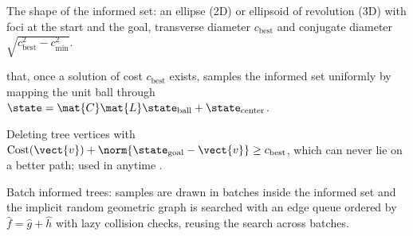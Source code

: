 \item[Prolate hyperspheroid] The shape of the informed set: an ellipse (2D) or ellipsoid of revolution (3D) with foci at the start and the goal, transverse diameter $c_{\mathrm{best}}$ and conjugate diameter $\sqrt{c_{\mathrm{best}}^2-c_{\min}^2}$.
\item[Informed RRT*] \rrtstar that, once a solution of cost $c_{\mathrm{best}}$ exists, samples the informed set uniformly by mapping the unit ball through $\state=\mat{C}\mat{L}\state_{\mathrm{ball}}+\state_{\mathrm{center}}$.
\item[Branch-and-bound pruning] Deleting tree vertices with $\mathrm{Cost}(\vect{v})+\norm{\state_{\mathrm{goal}}-\vect{v}}\ge c_{\mathrm{best}}$, which can never lie on a better path; used in anytime \rrtstar.
\item[BIT*] Batch informed trees: samples are drawn in batches inside the informed set and the implicit random geometric graph is searched with an edge queue ordered by $\hat f=\hat g+\hat h$ with lazy collision checks, reusing the search across batches.
